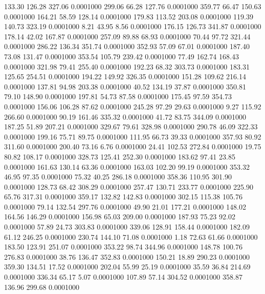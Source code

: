  133.30  126.28  327.06   0.0001000
 299.06   66.28  127.76   0.0001000
 359.77   66.47  150.63   0.0001000
 164.21   58.59  128.14   0.0001000
 179.83  113.52  203.08   0.0001000
 119.39  140.73  323.19   0.0001000
   8.21   43.95    8.56   0.0001000
 176.15  126.73  341.87   0.0001000
 178.14   42.02  167.87   0.0001000
 257.09   89.88   68.93   0.0001000
  70.44   97.72  321.44   0.0001000
 286.22  136.34  351.74   0.0001000
 352.93   57.09   67.01   0.0001000
 187.40   73.08  131.47   0.0001000
 353.54  105.79  239.42   0.0001000
  77.49  162.74  168.43   0.0001000
 321.98   79.41  255.40   0.0001000
 192.23   68.32  303.73   0.0001000
 183.31  125.65  254.51   0.0001000
 194.22  149.92  326.35   0.0001000
 151.28  109.62  216.14   0.0001000
 137.81   94.98  203.38   0.0001000
  40.52  134.19   37.87   0.0001000
 350.81   79.10  148.90   0.0001000
 197.81   54.73   87.58   0.0001000
 175.45   97.59  354.73   0.0001000
 156.06  106.28   87.62   0.0001000
 245.28   97.29   29.63   0.0001000
   9.27  115.92  266.60   0.0001000
  90.19  161.46  335.32   0.0001000
  41.72   83.75  344.09   0.0001000
 187.25   51.89  207.21   0.0001000
 329.67   79.61  328.98   0.0001000
 290.78   46.09  322.33   0.0001000
 199.16   75.71   89.75   0.0001000
 111.95   66.73   39.33   0.0001000
 357.93   80.92  311.60   0.0001000
 200.40   73.16    6.76   0.0001000
  24.41  102.53  272.84   0.0001000
  19.75   80.82  108.17   0.0001000
 328.73  125.41  252.30   0.0001000
 183.62   97.41   23.85   0.0001000
 161.63  130.14   63.36   0.0001000
 163.03  102.20   99.19   0.0001000
 353.32   46.95   97.35   0.0001000
  75.32   40.25  286.18   0.0001000
 358.36  110.95  301.90   0.0001000
 128.73   68.42  308.29   0.0001000
 257.47  130.71  233.77   0.0001000
 225.90   65.76  317.31   0.0001000
 359.17  132.82  142.83   0.0001000
 302.15  115.38  105.76   0.0001000
  79.14  132.54  297.76   0.0001000
  49.90   21.01  177.21   0.0001000
 148.02  164.56  146.29   0.0001000
 156.98   65.03  209.00   0.0001000
 187.93   75.23   92.02   0.0001000
  57.89   24.73  303.83   0.0001000
 339.06  128.91  158.44   0.0001000
 182.09   61.12  246.25   0.0001000
 230.74  144.10   71.08   0.0001000
   1.18   72.63   61.66   0.0001000
 183.50  123.91  251.07   0.0001000
 353.22   98.74  344.96   0.0001000
 148.78  100.76  276.83   0.0001000
  38.76  136.47  352.83   0.0001000
 150.21   18.89  290.23   0.0001000
 359.30  134.51   17.52   0.0001000
 202.04   55.99   25.19   0.0001000
  35.59   36.84  214.69   0.0001000
 336.34   65.17    5.07   0.0001000
 107.89   57.14  304.52   0.0001000
 358.87  136.96  299.68   0.0001000
